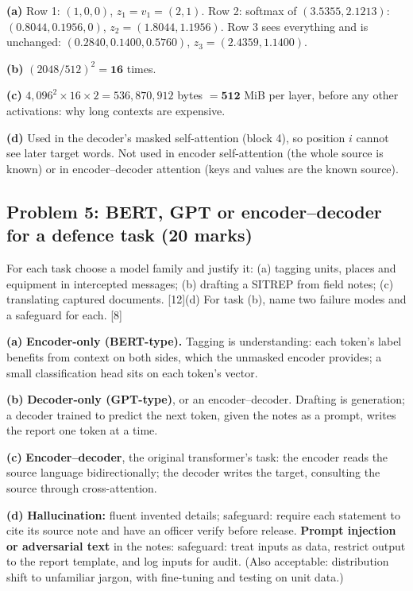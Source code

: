 \documentclass[11pt]{article}
\begin{document}
\begin{soln}\textbf{(a)} Row 1: $(1,0,0)$, $z_1=v_1=(2,1)$. Row 2: softmax of $(3.5355,2.1213)$: $(0.8044,0.1956,0)$, $z_2=(1.8044,1.1956)$. Row 3 sees everything and is unchanged: $(0.2840,0.1400,0.5760)$, $z_3=(2.4359,1.1400)$.

\textbf{(b)} $(2048/512)^2=\mathbf{16}$ times.

\textbf{(c)} $4{,}096^2\times16\times2=536{,}870{,}912$ bytes $=\mathbf{512}$ MiB per layer, before any other activations: why long contexts are expensive.

\textbf{(d)} Used in the decoder's masked self-attention (block 4), so position $i$ cannot see later target words. Not used in encoder self-attention (the whole source is known) or in encoder--decoder attention (keys and values are the known source).\end{soln}

\subsection{Problem 5: BERT, GPT or encoder--decoder for a defence task \normalfont\small\color{GreyN}(20 marks)}

\begin{prob}For each task choose a model family and justify it: (a) tagging units, places and equipment in intercepted messages; (b) drafting a SITREP from field notes; (c) translating captured documents. [12]\newline (d) For task (b), name two failure modes and a safeguard for each. [8]\end{prob}

\begin{soln}\textbf{(a)} \textbf{Encoder-only (BERT-type).} Tagging is understanding: each token's label benefits from context on both sides, which the unmasked encoder provides; a small classification head sits on each token's vector.

\textbf{(b)} \textbf{Decoder-only (GPT-type)}, or an encoder--decoder. Drafting is generation; a decoder trained to predict the next token, given the notes as a prompt, writes the report one token at a time.

\textbf{(c)} \textbf{Encoder--decoder}, the original transformer's task: the encoder reads the source language bidirectionally; the decoder writes the target, consulting the source through cross-attention.

\textbf{(d)} \textbf{Hallucination:} fluent invented details; safeguard: require each statement to cite its source note and have an officer verify before release. \textbf{Prompt injection or adversarial text} in the notes: safeguard: treat inputs as data, restrict output to the report template, and log inputs for audit. (Also acceptable: distribution shift to unfamiliar jargon, with fine-tuning and testing on unit data.)\end{soln}
\end{document}

